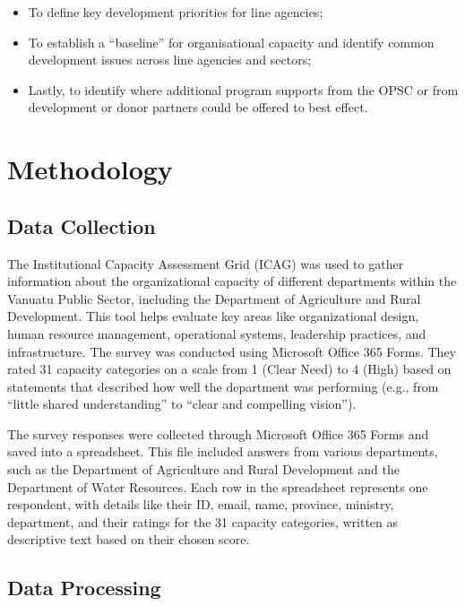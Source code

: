 \documentclass[
  10pt,
]{report}
\providecommand{\tightlist}{%
  \setlength{\itemsep}{0pt}\setlength{\parskip}{0pt}}
\begin{document}
\begin{itemize}
\tightlist
\item
  To define key development priorities for line agencies;
\item
  To establish a ``baseline'' for organisational capacity and identify
  common development issues across line agencies and sectors;
\item
  Lastly, to identify where additional program supports from the OPSC or
  from development or donor partners could be offered to best effect.
\end{itemize}

\section{Methodology}\label{methodology}

\subsection{Data Collection}\label{data-collection}

The Institutional Capacity Assessment Grid (ICAG) was used to gather
information about the organizational capacity of different departments
within the Vanuatu Public Sector, including the Department of
Agriculture and Rural Development. This tool helps evaluate key areas
like organizational design, human resource management, operational
systems, leadership practices, and infrastructure. The survey was
conducted using Microsoft Office 365 Forms. They rated 31 capacity
categories on a scale from 1 (Clear Need) to 4 (High) based on
statements that described how well the department was performing (e.g.,
from ``little shared understanding'' to ``clear and compelling
vision'').

The survey responses were collected through Microsoft Office 365 Forms
and saved into a spreadsheet. This file included answers from various
departments, such as the Department of Agriculture and Rural Development
and the Department of Water Resources. Each row in the spreadsheet
represents one respondent, with details like their ID, email, name,
province, ministry, department, and their ratings for the 31 capacity
categories, written as descriptive text based on their chosen score.

\subsection{Data Processing}\label{data-processing}
\end{document}
